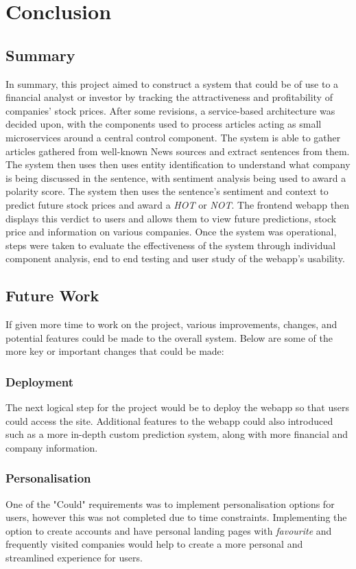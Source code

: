\chapter{Conclusion}    
\label{Conclusion}

    \section{Summary}
    In summary, this project aimed to construct a system that could be of use to a financial analyst or investor by tracking the attractiveness and profitability of companies' stock prices. After some revisions, a service-based architecture was decided upon, with the components used to process articles acting as small microservices around a central control component. The system is able to gather articles gathered from well-known News sources and extract sentences from them. The system then uses then uses entity identification to understand what company is being discussed in the sentence, with sentiment analysis being used to award a polarity score. The system then uses the sentence's sentiment and context to predict future stock prices and award a \textit{HOT} or \textit{NOT}. The frontend webapp then displays this verdict to users and allows them to view future predictions, stock price and information on various companies. Once the system was operational, steps were taken to evaluate the effectiveness of the system through individual component analysis, end to end testing and user study of the webapp's usability.
    
    
    \section{Future Work}
    If given more time to work on the project, various improvements, changes, and potential features could be made to the overall system. Below are some of the more key or important changes that could be made: 
        
        \subsection{Deployment}
        The next logical step for the project would be to deploy the webapp so that users could access the site. Additional features to the webapp could also introduced such as a more in-depth custom prediction system, along with more financial and company information.
        
        \subsection{Personalisation}
        One of the "Could" requirements was to implement personalisation options for users, however this was not completed due to time constraints. Implementing the option to create accounts and have personal landing pages with \textit{favourite} and frequently visited companies would help to create a more personal and streamlined experience for users. 
        
